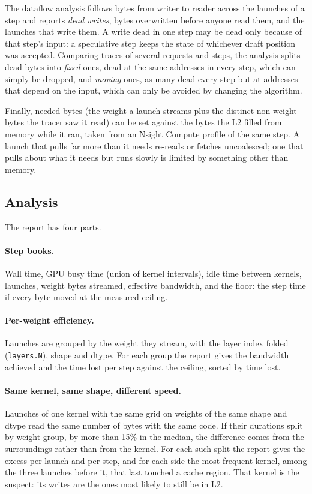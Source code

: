 The dataflow analysis follows bytes from writer to reader across the launches of a step and reports
\emph{dead writes}, bytes overwritten before anyone read them, and the launches that write them.
A write dead in one step may be dead only because of that step's input: a speculative step keeps
the state of whichever draft position was accepted. Comparing traces of several requests and steps,
the analysis splits dead bytes into \emph{fixed} ones, dead at the same addresses in every step,
which can simply be dropped, and \emph{moving} ones, as many dead every step but at addresses that
depend on the input, which can only be avoided by changing the algorithm.

Finally, needed bytes (the weight a launch streams plus the distinct non-weight bytes the tracer
saw it read) can be set against the bytes the L2 filled from memory while it ran, taken from an
Nsight Compute profile of the same step. A launch that pulls far more than it needs re-reads or
fetches uncoalesced; one that pulls about what it needs but runs slowly is limited by something
other than memory.

\subsection{Analysis}\label{sec:analysis}

The report has four parts.

\paragraph{Step books.} Wall time, GPU busy time (union of kernel intervals), idle time between
kernels, launches, weight bytes streamed, effective bandwidth, and the floor: the step time if
every byte moved at the measured ceiling.

\paragraph{Per-weight efficiency.} Launches are grouped by the weight they stream, with the layer
index folded (\texttt{layers.N}), shape and dtype. For each group the report gives the bandwidth
achieved and the time lost per step against the ceiling, sorted by time lost.

\paragraph{Same kernel, same shape, different speed.} Launches of one kernel with the same grid on
weights of the same shape and dtype read the same number of bytes with the same code. If their
durations split by weight group, by more than 15\% in the median, the difference comes from the
surroundings rather than from the kernel. For each such split the report gives the excess per
launch and per step, and for each side the most frequent kernel, among the three launches before it, that last touched a
cache region. That kernel is the suspect: its writes are the ones most likely to still be in L2.

